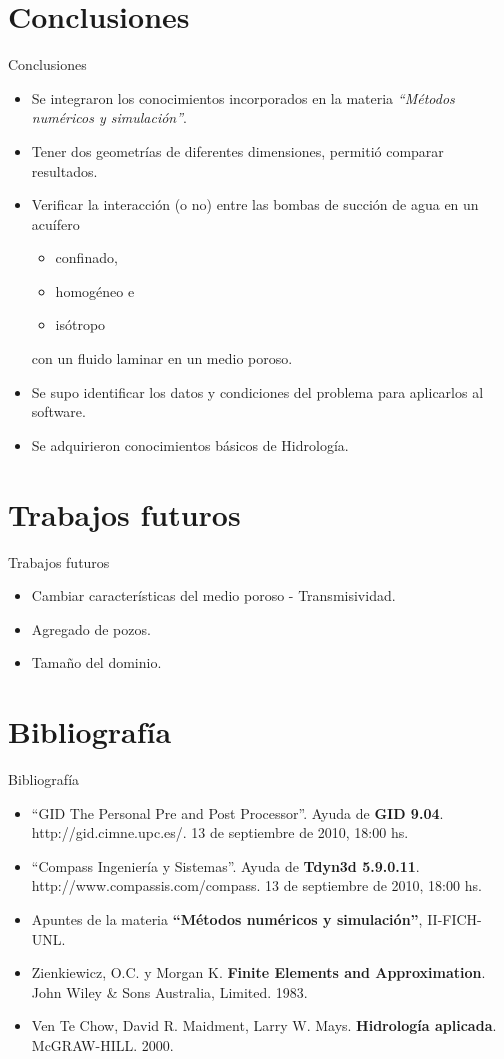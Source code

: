 \documentclass[spanish]{beamer}
\begin{document}
\section{Conclusiones}
\begin{frame}{Conclusiones}
\begin{itemize}
\item Se integraron los conocimientos incorporados en la materia \emph{``Métodos numéricos y simulación''}.
\item Tener dos geometrías de diferentes dimensiones, permitió comparar resultados.
\item Verificar la interacción (o no) entre las bombas de succión de agua en un acuífero
\begin{itemize}
\item confinado, 
\item homogéneo e 
\item isótropo
\end{itemize}
con un fluido laminar en un  medio poroso.
\item Se supo identificar los datos y condiciones del problema para aplicarlos al software.
\item Se adquirieron conocimientos básicos de Hidrología.
\end{itemize}
\end{frame}
%
\section{Trabajos futuros}
\begin{frame}{Trabajos futuros}
  \begin{itemize}
  \item Cambiar características del medio poroso - Transmisividad.
  \item Agregado de pozos.
  \item Tamaño del dominio.
  \end{itemize}
\end{frame}
\section{Bibliografía}
\begin{frame}{Bibliografía}
  \begin{itemize}
  \item ``GID The Personal Pre and Post Processor''. Ayuda de \textbf{GID 9.04}. http://gid.cimne.upc.es/. 13 de septiembre de 2010, 18:00 hs. 
  \item ``Compass Ingeniería y Sistemas''. Ayuda de \textbf{Tdyn3d 5.9.0.11}. http://www.compassis.com/compass. 13 de septiembre de 2010, 18:00 hs.
  \item Apuntes de la materia \textbf{``Métodos numéricos y simulación''}, II-FICH-UNL.
  \item Zienkiewicz,  O.C. y Morgan K. \textbf{Finite Elements and Approximation}. John Wiley \& Sons Australia, Limited. 1983.
  \item Ven Te Chow, David R. Maidment, Larry W. Mays. \textbf{Hidrología aplicada}. McGRAW-HILL. 2000.
 \end{itemize}
\end{frame}
\end{document}
